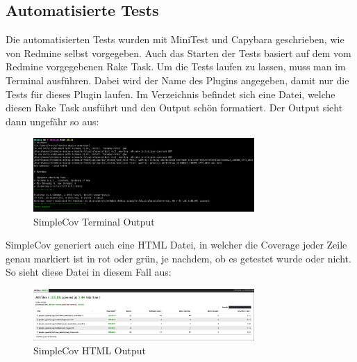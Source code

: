 \subsection{Automatisierte Tests}
\label{sec:automated-tests}
Die automatisierten Tests wurden mit MiniTest und Capybara geschrieben, wie von Redmine selbst
vorgegeben. Auch das Starten der Tests basiert auf dem vom Redmine vorgegebenen Rake Task. Um die
Tests laufen zu lassen, muss man  im Terminal
ausführen. Dabei wird der Name des Plugins angegeben, damit nur die Tests für dieses Plugin laufen. Im
 Verzeichnis befindet sich eine  Datei, welche
diesen Rake Task ausführt und den Output schön formatiert.
Der Output sieht dann ungefähr so aus:
\begin{figure}[H]
    \centering
    \includegraphics[width=0.75\textwidth]{images/misc/simplecov_terminal_output.png}
    \caption[Ein Screenshot des Terminal Outputs von SimpleCov]{SimpleCov Terminal Output}
    \label{fig:simplecov_terminal_output}
\end{figure}
SimpleCov generiert auch eine HTML Datei, in welcher die Coverage jeder Zeile genau markiert ist in
rot oder grün, je nachdem, ob es getestet wurde oder nicht. So sieht diese Datei in diesem Fall aus:
\begin{figure}[H]
    \centering
    \includegraphics[width=0.75\textwidth]{images/misc/simplecov_html.png}
    \caption[Ein Screenshot des generierten HTML Outputs von SimpleCov]{SimpleCov HTML Output}
    \label{fig:simplecov_html_output}
\end{figure}

